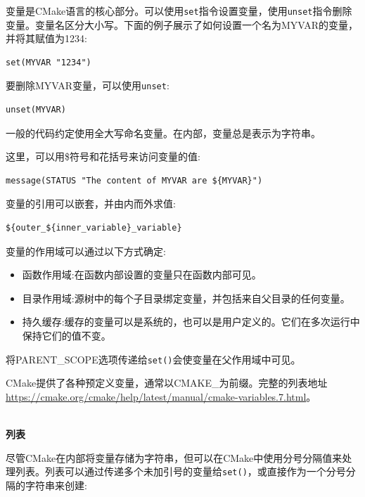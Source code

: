 变量是CMake语言的核心部分。可以使用\texttt{set}指令设置变量，使用\texttt{unset}指令删除变量。变量名区分大小写。下面的例子展示了如何设置一个名为MYVAR的变量，并将其赋值为1234:

\begin{lstlisting}[style=styleCMake]
set(MYVAR "1234")
\end{lstlisting}

要删除MYVAR变量，可以使用\texttt{unset}:

\begin{lstlisting}[style=styleCMake]
unset(MYVAR)
\end{lstlisting}

一般的代码约定使用全大写命名变量。在内部，变量总是表示为字符串。

这里，可以用\$符号和花括号来访问变量的值:

\begin{lstlisting}[style=styleCMake]
message(STATUS "The content of MYVAR are ${MYVAR}")
\end{lstlisting}

变量的引用可以嵌套，并由内而外求值:

\begin{lstlisting}[style=styleCMake]
${outer_${inner_variable}_variable}
\end{lstlisting}

变量的作用域可以通过以下方式确定:

\begin{itemize}
\item 
函数作用域:在函数内部设置的变量只在函数内部可见。

\item 
目录作用域:源树中的每个子目录绑定变量，并包括来自父目录的任何变量。

\item 
持久缓存:缓存的变量可以是系统的，也可以是用户定义的。它们在多次运行中保持它们的值不变。
\end{itemize}

将PARENT\_SCOPE选项传递给\texttt{set()}会使变量在父作用域中可见。

CMake提供了各种预定义变量，通常以CMAKE\_为前缀。完整的列表地址\url{https://cmake.org/cmake/help/latest/manual/cmake-variables.7.html}。

\hspace*{\fill} \\ %
\noindent
\textbf{列表}

尽管CMake在内部将变量存储为字符串，但可以在CMake中使用分号分隔值来处理列表。列表可以通过传递多个未加引号的变量给\texttt{set()}，或直接作为一个分号分隔的字符串来创建:

